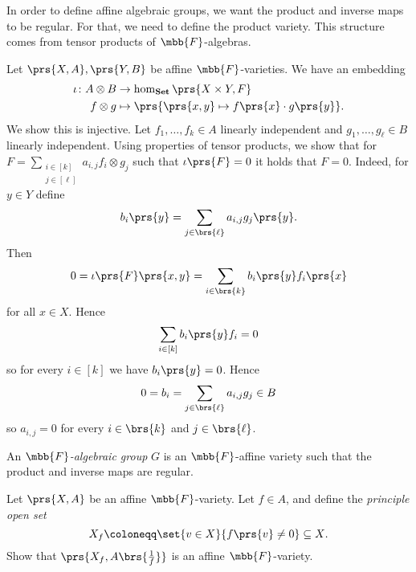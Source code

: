 \documentclass[10pt,a4paper,twoside,openany,hidelinks]{book}
\begin{document}
In order to define affine algebraic groups, we want the product and inverse maps to be regular. For that, we need to define the product variety. This structure comes from tensor products of $\mbb{F}$-algebras.

Let $\prs{X,A}, \prs{Y,B}$ be affine $\mbb{F}$-varieties. We have an embedding
\begin{align*}
\iota \colon A \otimes B &\to \hom_{\mathbf{Set}}\prs{X \times Y, F} \\
f \otimes g &\mapsto \prs{\prs{x,y} \mapsto f\prs{x} \cdot g\prs{y}} \text{.}
\end{align*}
We show this is injective.
Let $f_1, \ldots, f_k \in A$ linearly independent and $g_1, \ldots, g_\ell \in B$ linearly independent. Using properties of tensor products, we show that for $F = \sum_{\substack{i \in [k] \\ j \in [\ell]}} a_{i,j} f_i \otimes g_j$ such that $\iota\prs{F} = 0$ it holds that $F = 0$.
Indeed, for $y \in Y$ define
\[b_i\prs{y} = \sum_{j \in \brs{\ell}} a_{i,j} g_j\prs{y} \text{.}\]
Then
\[0 = \iota\prs{F} \prs{x,y} = \sum_{i \in \brs{k}} b_i\prs{y} f_i\prs{x}\]
for all $x \in X$. Hence
\[\sum_{i \in [k]} b_i\prs{y} f_i = 0\]
so for every $i \in [k]$ we have $b_i\prs{y} = 0$. Hence
\begin{align*}
0 = b_i = \sum_{j \in \brs{\ell}} a_{i,j} g_j \in B
\end{align*}
so $a_{i,j} = 0$ for every $i \in \brs{k}$ and $j \in \brs{\ell}$.

\begin{definition}
An \emph{$\mbb{F}$-algebraic group} $G$ is an $\mbb{F}$-affine variety such that the product and inverse maps are regular.
\end{definition}


\begin{exercise}
Let $\prs{X,A}$ be an affine $\mbb{F}$-variety. Let $f \in A$, and define the \emph{principle open set}
\[X_f \coloneqq \set{v \in X}{f\prs{v} \neq 0} \subseteq X \text{.}\]
Show that $\prs{X_f, A\brs{\frac{1}{f}}}$ is an affine $\mbb{F}$-variety.
\end{exercise}
\end{document}
